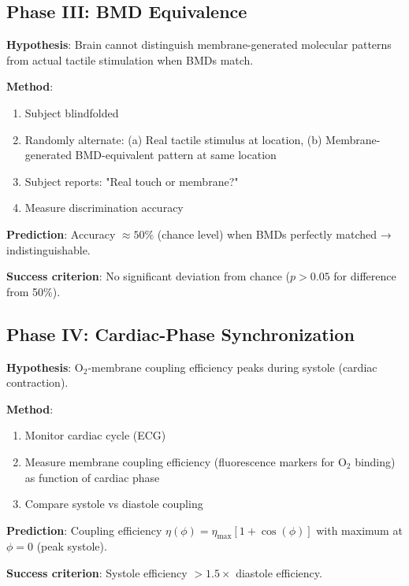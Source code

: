 \documentclass[11pt,a4paper]{article}
\theoremstyle{definition}
\theoremstyle{remark}
\begin{document}
\subsection{Phase III: BMD Equivalence}

\begin{experiment}
\textbf{Hypothesis}: Brain cannot distinguish membrane-generated molecular patterns from actual tactile stimulation when BMDs match.

\textbf{Method}:
\begin{enumerate}
\item Subject blindfolded
\item Randomly alternate: (a) Real tactile stimulus at location, (b) Membrane-generated BMD-equivalent pattern at same location
\item Subject reports: "Real touch or membrane?"
\item Measure discrimination accuracy
\end{enumerate}

\textbf{Prediction}: Accuracy $\approx 50\%$ (chance level) when BMDs perfectly matched → indistinguishable.

\textbf{Success criterion}: No significant deviation from chance ($p > 0.05$ for difference from 50\%).
\end{experiment}

\subsection{Phase IV: Cardiac-Phase Synchronization}

\begin{experiment}
\textbf{Hypothesis}: O$_2$-membrane coupling efficiency peaks during systole (cardiac contraction).

\textbf{Method}:
\begin{enumerate}
\item Monitor cardiac cycle (ECG)
\item Measure membrane coupling efficiency (fluorescence markers for O$_2$ binding) as function of cardiac phase
\item Compare systole vs diastole coupling
\end{enumerate}

\textbf{Prediction}: Coupling efficiency $\eta(\phi) = \eta_{\max}[1 + \cos(\phi)]$ with maximum at $\phi = 0$ (peak systole).

\textbf{Success criterion}: Systole efficiency $>1.5\times$ diastole efficiency.
\end{experiment}
\end{document}

